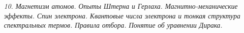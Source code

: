 \emph{10. Магнетизм атомов. Опыты Штерна и Герлаха. Магнитно-механические 
эффекты. Спин электрона. Квантовые числа электрона и тонкая структура 
спектральных термов. Правила отбора. Понятие об уравнении Дирака.}

\newpage
